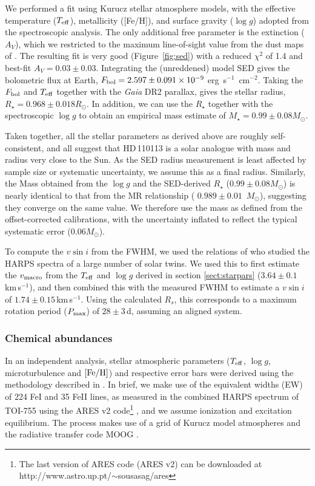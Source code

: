 \documentclass[fleqn,usenatbib]{mnras}
\newcommand{\harps}{{HARPS}}
\newcommand{\kms}{km\,s$^{-1}$}
\newcommand{\rstar}{\mbox{$R_{\star}$}}
\newcommand{\msun}{\mbox{$M_{\odot}$}}
\newcommand{\vsini}{$v\sin{i}$}
\newcommand{\teff}{$T_{\rm eff}$}
\newcommand{\feh}{\mbox{$\rm [Fe/H]$}}
\newcommand{\logg}{$\log g$}
\newcommand{\Tmstartorres}{ $ 0.989 \pm 0.01 $ }
\newcommand{\Tstar}{HD\,110113}
\begin{document}
We performed a fit using Kurucz stellar atmosphere models, with the effective temperature ($T_{\rm eff}$), metallicity ([Fe/H]), and surface gravity ($\log g$) adopted from the spectroscopic analysis. The only additional free parameter is the extinction ($A_V$), which we restricted to the maximum line-of-sight value from the dust maps of \citet{Schlegel:1998}. The resulting fit is very good (Figure~\ref{fig:sed}) with a reduced $\chi^2$ of 1.4 and best-fit $A_V = 0.03 \pm 0.03$. Integrating the (unreddened) model SED gives the bolometric flux at Earth, $F_{\rm bol} = 2.597 \pm 0.091 \times 10^{-9}$ erg~s$^{-1}$~cm$^{-2}$. Taking the $F_{\rm bol}$ and $T_{\rm eff}$ together with the {\it Gaia\/} DR2 parallax, gives the stellar radius, $R_\star = 0.968 \pm 0.018 R_\odot$. In addition, we can use the $R_\star$ together with the spectroscopic $\log g$ to obtain an empirical mass estimate of $M_\star = 0.99 \pm 0.08 M_\odot$.

Taken together, all the stellar parameters as derived above are roughly self-consistent, and all suggest that \Tstar{} is a solar analogue with mass and radius very close to the Sun.
As the SED radius measurement is least affected by sample size or systematic uncertainty, we assume this as a final radius.
Similarly, the Mass obtained from the \logg{} and the SED-derived \rstar{} ($0.99 \pm 0.08 M_\odot$) is nearly identical to that from the MR relationship (\Tmstartorres{}\,\msun{}), suggesting they converge on the same value.
We therefore use the mass as defined from the offset-corrected \citet{2010A&ARv..18...67T} calibrations, with the uncertainty inflated to reflect the typical systematic error ($0.06M_{\odot}$).

To compute the \vsini{} from the FWHM, we used the relations of \citet{dos2016solar} who studied the \harps{} spectra of a large number of solar twins.
We used this to first estimate the $v_{\rm macro}$ from the \teff{} and \logg{} derived in section \ref{sect:starpars} ($3.64\pm0.1$\,\kms{}), and then combined this with the measured FWHM to estimate a \vsini{} of $1.74\pm0.15$\,\kms{}.
Using the calculated $R_s$, this corresponds to a maximum rotation period ($P_{\rm max}$) of $28\pm3$\,d, assuming an aligned system.

\subsubsection{Chemical abundances} \label{sec:parameters}
In an independent analysis, stellar atmospheric parameters (\teff{}, \logg{}, microturbulence and \feh{}) and respective error bars were derived using the methodology described in \citet{Sousa-14, Santos-13}. In brief, we make use of the equivalent widths (EW) of 224 FeI and 35 FeII lines, as measured in the combined HARPS spectrum of TOI-755 using the ARES v2 code\footnote{The last version of ARES code (ARES v2) can be downloaded at http://www.astro.up.pt/$\sim$sousasag/ares} \citep{Sousa-15}, and we assume ionization and excitation equilibrium. The process makes use of a grid of Kurucz model atmospheres \citep{Kurucz-93} and the radiative transfer code MOOG \citep{Sneden-73}.
\end{document}
